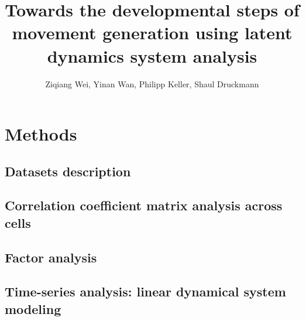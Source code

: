 \documentclass[11pt, oneside]{article}   	%
\title{Towards the developmental steps of movement generation using latent dynamics system analysis}
\author{Ziqiang Wei, Yinan Wan, Philipp Keller, Shaul Druckmann}
\date{}							%
\begin{document}
\maketitle
\section{Methods}
\subsection{Datasets description}
\subsection{Correlation coefficient matrix analysis across cells}
\subsection{Factor analysis}
\subsection{Time-series analysis: linear dynamical system modeling}
\end{document}
